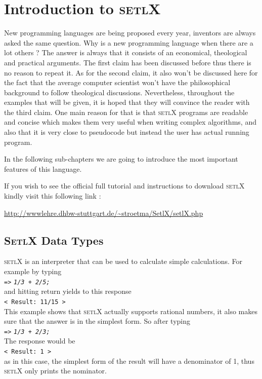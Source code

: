 \documentclass[11pt]{article}
\begin{document}
\section{Introduction to \textsc{setlX}}

New programming languages are being proposed every year, inventors are always asked the same question. Why is a new programming language when there are a lot others ? The answer is always that it consists of an economical, theological and practical arguments. The first claim has been discussed before thus there is no reason to repeat it. As for the second claim, it also won't be discussed here for the fact that the average computer scientist won't have the philosophical background to follow theological discussions. Nevertheless, throughout the examples that will be given, it is hoped that they will convince the reader with the third claim. One main reason for that is that \textsc{setlX} programs are readable and concise which makes them very useful when writing complex algorithms, and also that it is very close to pseudocode but instead the user has actual running program.

In the following sub-chapters we are going to introduce the most important features of this language.

\begin{center} If you wish to see the official full tutorial and instructions to download \textsc{setlX} kindly visit this following link : 

\url{http://wwwlehre.dhbw-stuttgart.de/~stroetma/SetlX/setlX.php} \end{center}

\subsection{\textsc{SetlX} Data Types}

\textsc{setlX} is an interpreter that can be used to calculate simple calculations. For example by typing 
\\[0.2cm]
\hspace*{1.3cm}
\texttt{=>} \texttt{\textsl{1/3 + 2/5;}}
\\[0.2cm]
and hitting return yields to this response
\\[0.2cm]
\hspace*{1.3cm}
\texttt{< Result: 11/15 >}
\\[0.2cm]
This example shows that \textsc{setlX} actually supports rational numbers, it also makes sure that the answer is in the simplest form. So after typing
\\[0.2cm]
\hspace*{1.3cm}
\texttt{=>} \texttt{\textsl{1/3 + 2/3;}}
\\[0.2cm]
The response would be
\\[0.2cm]
\hspace*{1.3cm}
\texttt{< Result: 1 >}
\\[0.2cm]
as in this case, the simplest form of the result will have a denominator of 1, thus \textsc{setlX} only prints the nominator.
\end{document}
